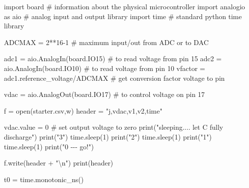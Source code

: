 \documentclass[
  letterpaper,
  DIV=11,
  numbers=noendperiod]{scrartcl}
\newenvironment{Shaded}{\begin{snugshade}}{\end{snugshade}}
\newcommand{\BuiltInTok}[1]{\textcolor[rgb]{0.00,0.23,0.31}{#1}}
\newcommand{\CharTok}[1]{\textcolor[rgb]{0.13,0.47,0.30}{#1}}
\newcommand{\CommentTok}[1]{\textcolor[rgb]{0.37,0.37,0.37}{#1}}
\newcommand{\DecValTok}[1]{\textcolor[rgb]{0.68,0.00,0.00}{#1}}
\newcommand{\ImportTok}[1]{\textcolor[rgb]{0.00,0.46,0.62}{#1}}
\newcommand{\NormalTok}[1]{\textcolor[rgb]{0.00,0.23,0.31}{#1}}
\newcommand{\OperatorTok}[1]{\textcolor[rgb]{0.37,0.37,0.37}{#1}}
\newcommand{\StringTok}[1]{\textcolor[rgb]{0.13,0.47,0.30}{#1}}
\begin{document}
\begin{Shaded}
\begin{Highlighting}[]
\ImportTok{import}\NormalTok{ board }\CommentTok{\# information about the physical microcontroller}
\ImportTok{import}\NormalTok{ analogio }\ImportTok{as}\NormalTok{ aio }\CommentTok{\# analog input and output library}
\ImportTok{import}\NormalTok{ time }\CommentTok{\# standard python time library}

\NormalTok{ADCMAX }\OperatorTok{=} \DecValTok{2}\OperatorTok{**}\DecValTok{16}\OperatorTok{{-}}\DecValTok{1} \CommentTok{\# maximum input/out from ADC or to DAC}

\NormalTok{adc1 }\OperatorTok{=}\NormalTok{ aio.AnalogIn(board.IO15)  }\CommentTok{\# to read voltage from pin 15}
\NormalTok{adc2 }\OperatorTok{=}\NormalTok{ aio.AnalogIn(board.IO10)  }\CommentTok{\# to read voltage from pin 10}
\NormalTok{vfactor }\OperatorTok{=}\NormalTok{ adc1.reference\_voltage}\OperatorTok{/}\NormalTok{ADCMAX }\CommentTok{\# get conversion factor voltage to pin}

\NormalTok{vdac }\OperatorTok{=}\NormalTok{ aio.AnalogOut(board.IO17) }\CommentTok{\# to control voltage on pin 17}

\NormalTok{f }\OperatorTok{=} \BuiltInTok{open}\NormalTok{(}\StringTok{\textquotesingle{}starter.csv\textquotesingle{}}\NormalTok{,}\StringTok{\textquotesingle{}w\textquotesingle{}}\NormalTok{)}
\NormalTok{header }\OperatorTok{=} \StringTok{"j,vdac,v1,v2,time"}


\NormalTok{vdac.value }\OperatorTok{=} \DecValTok{0} \CommentTok{\# set output voltage to zero}
\BuiltInTok{print}\NormalTok{(}\StringTok{"sleeping.... let C fully discharge"}\NormalTok{)}
\BuiltInTok{print}\NormalTok{(}\StringTok{"3"}\NormalTok{)}
\NormalTok{time.sleep(}\DecValTok{1}\NormalTok{)}
\BuiltInTok{print}\NormalTok{(}\StringTok{"2"}\NormalTok{)}
\NormalTok{time.sleep(}\DecValTok{1}\NormalTok{)}
\BuiltInTok{print}\NormalTok{(}\StringTok{"1"}\NormalTok{)}
\NormalTok{time.sleep(}\DecValTok{1}\NormalTok{)}
\BuiltInTok{print}\NormalTok{(}\StringTok{"0 {-}{-}{-} go!"}\NormalTok{)}

\NormalTok{f.write(header }\OperatorTok{+} \StringTok{"}\CharTok{\textbackslash{}n}\StringTok{"}\NormalTok{)}
\BuiltInTok{print}\NormalTok{(header)}

\NormalTok{t0 }\OperatorTok{=}\NormalTok{ time.monotonic\_ns()}


\end{Highlighting}
\end{Shaded}
\end{document}
